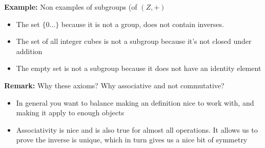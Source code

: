 \documentclass{article}
\begin{document}
\begin{example} 
	\textbf{Example:} Non examples of subgroups (of $(Z,+)$
\begin{itemize}
	\item The set $\{0\ldots\}$ because it is not a group, does not contain inverses.
	\item The set of all integer cubes is not a subgroup because it's not closed under addition
	\item The empty set is not a subgroup because it does not have an identity element
\end{itemize}
\end{example}

\begin{remark} 
\textbf{Remark:} Why these axioms? Why associative and not commutative?
\begin{itemize}
	\item In general you want to balance making an definition nice to work with, and making it apply to enough objects
	\item Associativity is nice and is also true for almost all operations. It allows us to prove the inverse is unique, which in turn gives us a nice bit of symmetry 
\end{itemize}
\end{remark}
\end{document}
